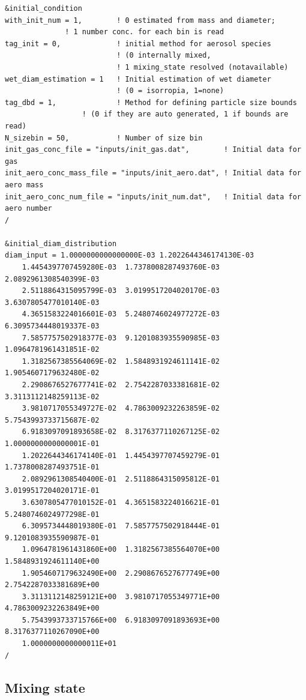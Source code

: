 \documentclass[a4paper,11pt]{article}
\begin{document}
\begin{verbatim}
&initial_condition
with_init_num = 1,        ! 0 estimated from mass and diameter; 
			  ! 1 number conc. for each bin is read 
tag_init = 0,             ! initial method for aerosol species 
                          ! (0 internally mixed,
                          ! 1 mixing_state resolved (notavailable)
wet_diam_estimation = 1   ! Initial estimation of wet diameter
                          ! (0 = isorropia, 1=none)
tag_dbd = 1,	          ! Method for defining particle size bounds 
		          ! (0 if they are auto generated, 1 if bounds are read)
N_sizebin = 50,           ! Number of size bin
init_gas_conc_file = "inputs/init_gas.dat",        ! Initial data for gas
init_aero_conc_mass_file = "inputs/init_aero.dat", ! Initial data for aero mass  
init_aero_conc_num_file = "inputs/init_num.dat",   ! Initial data for aero number  
/

&initial_diam_distribution       
diam_input = 1.0000000000000000E-03	1.2022644346174130E-03	
	1.4454397707459280E-03	1.7378008287493760E-03	2.0892961308540399E-03	
	2.5118864315095799E-03	3.0199517204020170E-03	3.6307805477010140E-03	
	4.3651583224016601E-03	5.2480746024977272E-03	6.3095734448019337E-03	
	7.5857757502918377E-03	9.1201083935590985E-03	1.0964781961431851E-02	
	1.3182567385564069E-02	1.5848931924611141E-02	1.9054607179632480E-02	
	2.2908676527677741E-02	2.7542287033381681E-02	3.3113112148259113E-02	
	3.9810717055349727E-02	4.7863009232263859E-02	5.7543993733715687E-02	
	6.9183097091893658E-02	8.3176377110267125E-02	1.0000000000000001E-01	
	1.2022644346174140E-01	1.4454397707459279E-01	1.7378008287493751E-01	
	2.0892961308540400E-01	2.5118864315095812E-01	3.0199517204020171E-01	
	3.6307805477010152E-01	4.3651583224016621E-01	5.2480746024977298E-01	
	6.3095734448019380E-01	7.5857757502918444E-01	9.1201083935590987E-01	
	1.0964781961431860E+00	1.3182567385564070E+00	1.5848931924611140E+00	
	1.9054607179632490E+00	2.2908676527677749E+00	2.7542287033381689E+00	
	3.3113112148259121E+00	3.9810717055349771E+00	4.7863009232263849E+00	
	5.7543993733715766E+00	6.9183097091893693E+00	8.3176377110267090E+00	
	1.0000000000000011E+01
/ 
\end{verbatim}


\subsection{Mixing state}
\end{document}
